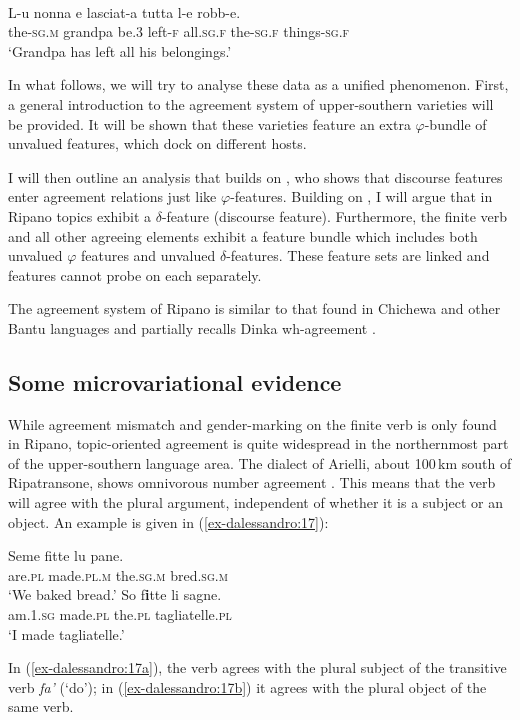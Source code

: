 \documentclass[output=paper
,modfonts
,nonflat]{langsci/langscibook}
\begin{document}
\begin{exe}
	\ex \label{ex-dalessandro:16}	\citet[140]{Rossi2008}\\
	\gll L-u   nonna   e   lasciat-a tutta   l-e   robb-e.\\
	the-\textsc{sg.m} grandpa  be.3  left-\textsc{f} all.\textsc{sg.f} the-\textsc{sg.f} things-\textsc{sg.f}\\
	\glt `Grandpa has left all his belongings.'
\end{exe}
In what follows, we will try to analyse these data as a unified phenomenon. First, a general introduction to the agreement system of upper-southern varieties will be provided. It will be shown that these varieties feature an extra $\varphi $-bundle of unvalued features, which dock on different hosts.

I will then outline an analysis that builds on \citet{Miyagawa2017}, who shows that discourse features enter agreement relations just like $\varphi$-features. Building on \citet{Miyagawa2017}, I will argue that in Ripano topics exhibit a $\delta$-feature (discourse feature). Furthermore, the finite verb and all other agreeing elements exhibit a feature bundle which includes both unvalued $\varphi $ features and unvalued $\delta$-features.  These feature sets are linked and features cannot probe on each separately. 

The agreement system of Ripano is similar to that found in Chichewa and other Bantu languages \citep{Bresnan_Mchombo1987} and partially recalls Dinka wh-agreement \citep{Van_Urk2015}.

\subsection{Some microvariational evidence} \label{sec-dalessandro:2.3}
While agreement mismatch and gender-marking on the finite verb is only found in Ripano, topic-oriented agreement is quite widespread in the northernmost part of the upper-southern language area. The dialect of Arielli, about 100\,km south of Ripatransone, shows omnivorous number agreement \citep{D`Alessandro_Roberts2010,D`Alessandro2017}. This means that the verb will agree with the plural argument, independent of whether it is a subject or an object. An example is given in (\ref{ex-dalessandro:17}):

\begin{exe} 
	\ex \label{ex-dalessandro:17} \xlist
	\ex   \label{ex-dalessandro:17a}
	\gll Seme   fitte   lu   pane.\\
	are.\textsc{pl} made.\textsc{pl.m} the.\textsc{sg.m} bred.\textsc{sg.m}\\
	\glt `We baked bread.' 
	\ex \label{ex-dalessandro:17b}
	\gll  So     f\textbf{i}tte   li         sagne.\\ 
	am.\textsc{1.sg} made.\textsc{pl} the.\textsc{pl} tagliatelle.\textsc{pl}\\ 
	\glt `I made tagliatelle.'
	\endxlist
\end{exe}
In (\ref{ex-dalessandro:17a}), the verb agrees with the plural subject of the transitive verb \textit{fa’} (‘do’); in (\ref{ex-dalessandro:17b}) it agrees with the plural object of the same verb. 
\end{document}
